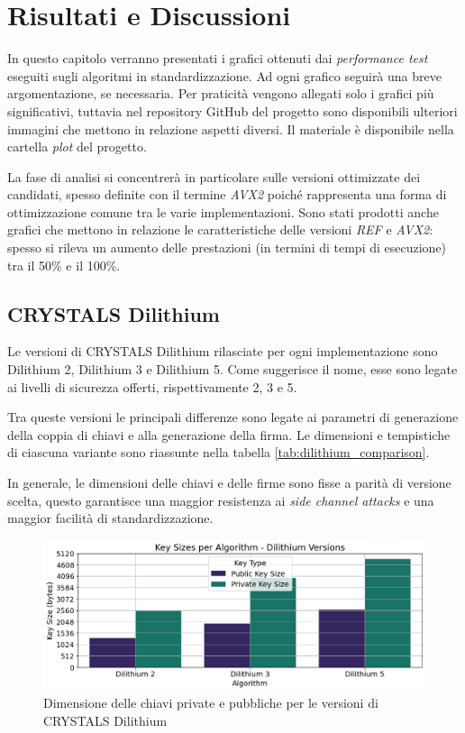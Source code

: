 \chapter{Risultati e Discussioni}

In questo capitolo verranno presentati i grafici ottenuti dai \textit{performance test} eseguiti sugli algoritmi in standardizzazione. Ad ogni grafico seguirà una breve argomentazione, se necessaria. Per praticità vengono allegati solo i grafici più significativi, tuttavia nel repository GitHub del progetto \cite{project-github} sono disponibili ulteriori immagini che mettono in relazione aspetti diversi. Il materiale è disponibile nella cartella \textit{plot} del progetto.

La fase di analisi si concentrerà in particolare sulle versioni ottimizzate dei candidati, spesso definite con il termine \textit{AVX2} poiché rappresenta una forma di ottimizzazione comune tra le varie implementazioni. Sono stati prodotti anche grafici che mettono in relazione le caratteristiche delle versioni \textit{REF} e \textit{AVX2}: spesso si rileva un aumento delle prestazioni (in termini di tempi di esecuzione) tra il 50\% e il 100\%.



\section{CRYSTALS Dilithium}

Le versioni di CRYSTALS Dilithium rilasciate per ogni implementazione sono Dilithium 2, Dilithium 3 e Dilithium 5. Come suggerisce il nome, esse sono legate ai livelli di sicurezza offerti, rispettivamente 2, 3 e 5.

Tra queste versioni le principali differenze sono legate ai parametri di generazione della coppia di chiavi e alla generazione della firma. Le dimensioni e tempistiche di ciascuna variante sono riassunte nella tabella \ref{tab:dilithium_comparison}.

In generale, le dimensioni delle chiavi e delle firme sono fisse a parità di versione scelta, questo garantisce una maggior resistenza ai \textit{side channel attacks} e una maggior facilità di standardizzazione.

\begin{figure}[H]
    \centering
    \includegraphics[width=1\textwidth]{Immagini/20240822_i9/Key_Sizes/KC_dilithium.png}
    \caption{Dimensione delle chiavi private e pubbliche per le versioni di CRYSTALS Dilithium}
    \label{fig:KC_dilithium}
\end{figure}

